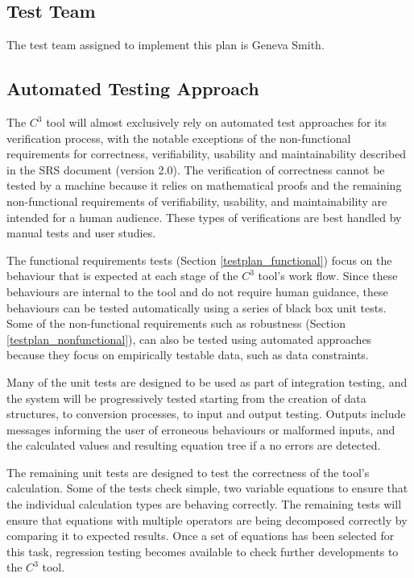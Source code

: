 \documentclass[12pt, titlepage]{article}
\newcommand{\prognameAbbrv}{$C^{3}$}
\newcommand{\srsVersion}{2.0}
\begin{document}
\subsection{Test Team}

The test team assigned to implement this plan is Geneva Smith.

\subsection{Automated Testing Approach}
The \prognameAbbrv{} tool will almost exclusively rely on automated test 
approaches for its verification process, with the notable exceptions of the 
non-functional requirements for correctness, verifiability, usability and 
maintainability described in the SRS document (version \srsVersion{}). The 
verification of correctness cannot be tested by a machine because it relies on 
mathematical proofs and the remaining non-functional requirements of 
verifiability, usability, and maintainability are intended for a 
human audience. These types of verifications are best handled by manual tests 
and user studies.

The functional requirements tests (Section \ref{testplan_functional}) focus on 
the behaviour that is expected at each stage of the \prognameAbbrv{} tool's 
work flow. Since these behaviours are internal to the tool and do not require 
human guidance, these behaviours can be tested automatically using a series of 
black box unit tests. Some of the non-functional requirements such as 
robustness (Section \ref{testplan_nonfunctional}), can also be tested using 
automated approaches because they focus on empirically testable data, such as 
data constraints.

Many of the unit tests are designed to be used as part of integration testing, 
and the system will be progressively tested starting from the creation of data 
structures, to conversion processes, to input and output testing. Outputs 
include messages informing the user of erroneous behaviours or malformed 
inputs, and the calculated values and resulting equation tree if a no errors 
are detected.

The remaining unit tests are designed to test the correctness of the tool's 
calculation. Some of the tests check simple, two variable equations to ensure 
that the individual calculation types are behaving correctly. The remaining 
tests will ensure that equations with multiple operators are being decomposed 
correctly by comparing it to expected results. Once a set of equations has been 
selected for this task, regression testing becomes available to check further 
developments to the \prognameAbbrv{} tool.
\end{document}
